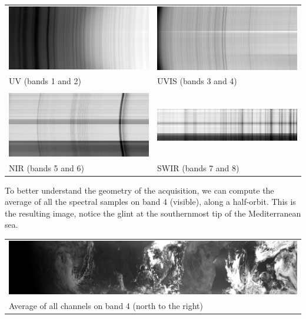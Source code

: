 \documentclass[a4paper]{article}    %
\theoremstyle{note}
\theoremstyle{plain}
\begin{document}
\begin{tabular}{ll}
	\includegraphics[width=0.48\linewidth]{f/lglint_12.png} &
	\includegraphics[width=0.48\linewidth]{f/lglint_34.png} \\
	UV (bands 1 and 2)& UVIS (bands 3 and 4) \\
	& \\
	\includegraphics[width=0.48\linewidth]{f/lglint_56.png} &
	\includegraphics[width=0.48\linewidth]{f/lglint_78.png} \\
	NIR (bands 5 and 6) & SWIR (bands 7 and 8)
\end{tabular}

To better understand the geometry of the acquisition, we can compute the
average of all the spectral samples on band 4 (visible), along a half-orbit.
This is the resulting image, notice the glint at the southernmost tip of the
Mediterranean sea.

\begin{tabular}{l}
\includegraphics[width=\linewidth]{f/rslice_b4_glint.png} \\
Average of all channels on band 4 (north to the right)
\end{tabular}
\end{document}
